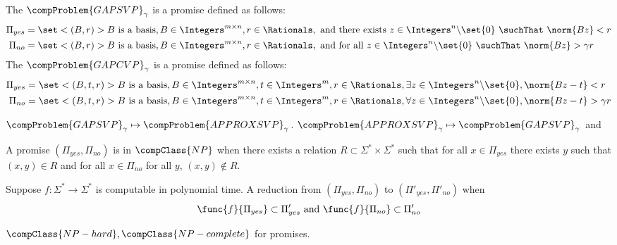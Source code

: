 \begin{definition}
    The \(\compProblem{GAPSVP}_{\gamma}\) is a promise defined as follows:
    \begin{align*}
        \Pi_{yes} &= \set<(B,r)>{B \text{ is a basis}, B \in \Integers^{m \times n}, r \in \Rationals, \text{ and there exists } z \in \Integers^n \backslash \set{0}\ \suchThat \ \norm{Bz} < r}\\
        \Pi_{no} &= \set<(B,r)>{B \text{ is a basis}, B \in \Integers^{m \times n}, r \in \Rationals, \text{ and for all } z \in \Integers^n \backslash \set{0}  \ \suchThat \ \norm{Bz} > \gamma r}
    \end{align*}
    The \(\compProblem{GAPCVP}_{\gamma}\) is a promise defined as follows:
    \begin{align*}
        \Pi_{yes} &= \set<(B,t,r)>{B \text{ is a basis}, B \in \Integers^{m \times n}, t \in \Integers^m, r \in \Rationals, \exists z \in \Integers^n \backslash \set{0},\norm{Bz - t} < r}\\
        \Pi_{no} &= \set<(B,t,r)>{B \text{ is a basis}, B \in \Integers^{m \times n}, t \in  \Integers^m, r \in \Rationals, \forall z \in \Integers^n \backslash \set{0}, \norm{Bz - t} > \gamma r}
    \end{align*}
\end{definition}
\begin{theorem}
    \(\compProblem{GAPSVP}_{\gamma} \mapsto \compProblem{APPROXSVP}_{\gamma}\).
    \(\compProblem{APPROXSVP}_{\gamma} \mapsto \compProblem{GAPSVP}_{\gamma}\) and 
\end{theorem}

\begin{definition}
    A promise \((\Pi_{yes},\Pi_{no})\) is in \(\compClass{NP}\) when there exists a relation \(R \subset \Sigma^{\ast} \times \Sigma^{\ast}\) such that for all \(x \in \Pi_{yes}\) there exists \(y\) such that \((x,y) \in R\) and for all \(x \in \Pi_{no}\) for all \(y\), \((x,y) \notin R\).
\end{definition}

\begin{definition}
    Suppose \(f: \Sigma^{\ast} \to \Sigma^{\ast}\) is computable in polynomial time. A reduction from \((\Pi_{yes}, \Pi_{no})\) to \((\Pi'_{yes}, \Pi'_{no})\) when 
    \begin{equation*}
        \func{f}{\Pi_{yes}} \subset \Pi'_{yes} \ \mathrm{and} \ \func{f}{\Pi_{no}} \subset \Pi'_{no}
    \end{equation*}
\end{definition}
\begin{definition}
    \(\compClass{NP-hard}, \compClass{NP-complete}\) for promises.
\end{definition}